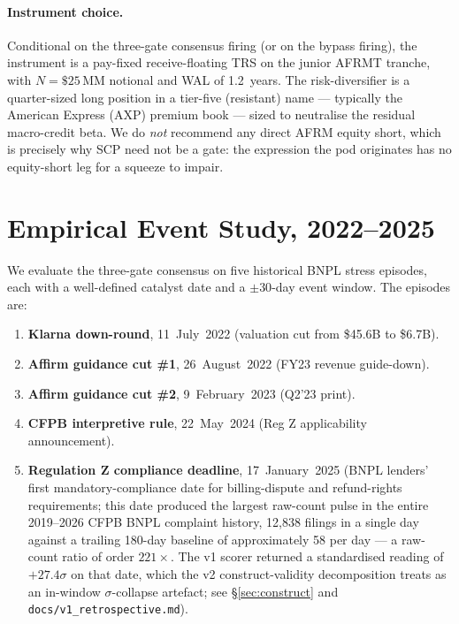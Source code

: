 \documentclass[11pt,letterpaper]{article}
\begin{document}
\paragraph{Instrument choice.}
Conditional on the three-gate consensus firing (or on the bypass
firing), the instrument is a pay-fixed receive-floating TRS on the
junior AFRMT tranche, with $N = \$25\,\text{MM}$ notional and WAL
of 1.2~years. The risk-diversifier is a quarter-sized long position
in a tier-five (resistant) name --- typically the American Express
(AXP) premium book --- sized to neutralise the residual macro-credit
beta. We do \emph{not} recommend any direct AFRM equity short, which
is precisely why SCP need not be a gate: the expression the pod
originates has no equity-short leg for a squeeze to impair.


\section{Empirical Event Study, 2022--2025}
\label{sec:empirical}

We evaluate the three-gate consensus on five historical BNPL stress
episodes, each with a well-defined catalyst date and a $\pm30$-day
event window. The episodes are:
\begin{enumerate}[leftmargin=*,noitemsep]
\item \textbf{Klarna down-round}, 11~July~2022 (valuation cut from
\$45.6B to \$6.7B).
\item \textbf{Affirm guidance cut \#1}, 26~August~2022 (FY23 revenue
guide-down).
\item \textbf{Affirm guidance cut \#2}, 9~February~2023 (Q2'23 print).
\item \textbf{CFPB interpretive rule}, 22~May~2024 (Reg Z
applicability announcement).
\item \textbf{Regulation Z compliance deadline}, 17~January~2025
(BNPL lenders' first mandatory-compliance date for billing-dispute and
refund-rights requirements; this date produced the largest raw-count
pulse in the entire 2019--2026 CFPB BNPL complaint history,
12{,}838 filings in a single day against a trailing 180-day baseline
of approximately 58 per day --- a raw-count ratio of order
$221\times$. The v1 scorer returned a standardised reading of
$+27.4\sigma$ on that date, which the v2 construct-validity
decomposition treats as an in-window $\sigma$-collapse artefact; see
\S\ref{sec:construct} and \texttt{docs/v1\_retrospective.md}).
\end{enumerate}
\end{document}

